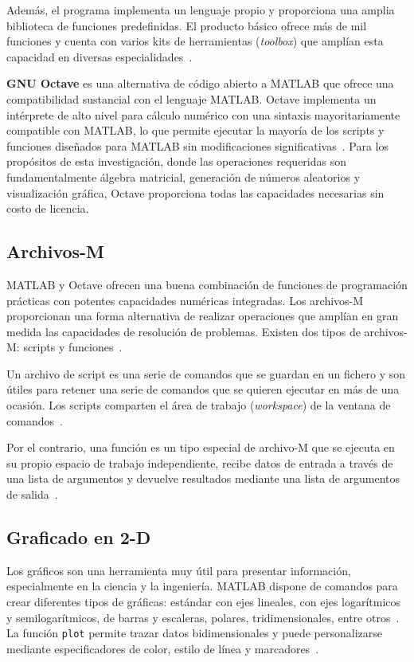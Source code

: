 Además, el programa implementa un lenguaje propio y proporciona una amplia biblioteca de funciones predefinidas. El producto básico ofrece más de mil funciones y cuenta con varios kits de herramientas (\textit{toolbox}) que amplían esta capacidad en diversas especialidades~\cite{chapman2020,belfadel2021}.

\textbf{GNU Octave} es una alternativa de código abierto a MATLAB que ofrece una compatibilidad sustancial con el lenguaje MATLAB. Octave implementa un intérprete de alto nivel para cálculo numérico con una sintaxis mayoritariamente compatible con MATLAB, lo que permite ejecutar la mayoría de los scripts y funciones diseñados para MATLAB sin modificaciones significativas~\cite{eaton2024}. Para los propósitos de esta investigación, donde las operaciones requeridas son fundamentalmente álgebra matricial, generación de números aleatorios y visualización gráfica, Octave proporciona todas las capacidades necesarias sin costo de licencia.

\subsection{Archivos-M}
\label{sec:2.4.1}

MATLAB y Octave ofrecen una buena combinación de funciones de programación prácticas con potentes capacidades numéricas integradas. Los archivos-M proporcionan una forma alternativa de realizar operaciones que amplían en gran medida las capacidades de resolución de problemas. Existen dos tipos de archivos-M: scripts y funciones~\cite{chapman2020,young2023}.

Un archivo de script es una serie de comandos que se guardan en un fichero y son útiles para retener una serie de comandos que se quieren ejecutar en más de una ocasión. Los scripts comparten el área de trabajo (\textit{workspace}) de la ventana de comandos~\cite{attaway2022}.

Por el contrario, una función es un tipo especial de archivo-M que se ejecuta en su propio espacio de trabajo independiente, recibe datos de entrada a través de una lista de argumentos y devuelve resultados mediante una lista de argumentos de salida~\cite{chapman2020}.

\subsection{Graficado en 2-D}
\label{sec:2.4.2}

Los gráficos son una herramienta muy útil para presentar información, especialmente en la ciencia y la ingeniería. MATLAB dispone de comandos para crear diferentes tipos de gráficas: estándar con ejes lineales, con ejes logarítmicos y semilogarítmicos, de barras y escaleras, polares, tridimensionales, entre otros~\cite{gilat2017}. La función \texttt{plot} permite trazar datos bidimensionales y puede personalizarse mediante especificadores de color, estilo de línea y marcadores~\cite{mueller2021}.

